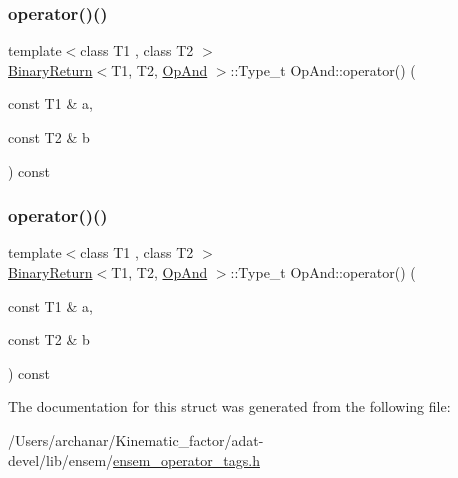 \mbox{\label{structOpAnd_a27c9f5545b8961284cc388628ac2f9bb}} 
\subsubsection{\texorpdfstring{operator()()}{operator()()}\hspace{0.1cm}{\footnotesize\ttfamily [2/3]}}
{\footnotesize\ttfamily template$<$class T1 , class T2 $>$ \\
\mbox{\hyperlink{structBinaryReturn}{Binary\+Return}}$<$T1, T2, \mbox{\hyperlink{structOpAnd}{Op\+And}} $>$\+::Type\+\_\+t Op\+And\+::operator() (\begin{DoxyParamCaption}\item[{const T1 \&}]{a,  }\item[{const T2 \&}]{b }\end{DoxyParamCaption}) const\hspace{0.3cm}{\ttfamily [inline]}}

\mbox{\label{structOpAnd_a27c9f5545b8961284cc388628ac2f9bb}} 
\subsubsection{\texorpdfstring{operator()()}{operator()()}\hspace{0.1cm}{\footnotesize\ttfamily [3/3]}}
{\footnotesize\ttfamily template$<$class T1 , class T2 $>$ \\
\mbox{\hyperlink{structBinaryReturn}{Binary\+Return}}$<$T1, T2, \mbox{\hyperlink{structOpAnd}{Op\+And}} $>$\+::Type\+\_\+t Op\+And\+::operator() (\begin{DoxyParamCaption}\item[{const T1 \&}]{a,  }\item[{const T2 \&}]{b }\end{DoxyParamCaption}) const\hspace{0.3cm}{\ttfamily [inline]}}



The documentation for this struct was generated from the following file\+:\begin{DoxyCompactItemize}
\item 
/\+Users/archanar/\+Kinematic\+\_\+factor/adat-\/devel/lib/ensem/\mbox{\hyperlink{adat-devel_2lib_2ensem_2ensem__operator__tags_8h}{ensem\+\_\+operator\+\_\+tags.\+h}}\end{DoxyCompactItemize}
